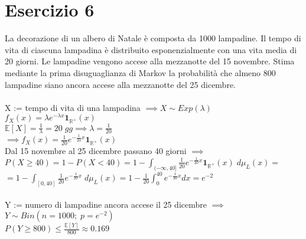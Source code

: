 \documentclass{article}
\begin{document}
\section*{Esercizio 6}
La decorazione di un albero di Natale è composta da 1000 lampadine. Il tempo di vita di ciascuna lampadina è distribuito esponenzialmente con una vita media di 20 giorni. Le lampadine vengono accese alla mezzanotte del 15 novembre. Stima mediante la prima disuguaglianza di Markov la probabilità che almeno 800 lampadine siano ancora accese alla mezzanotte del 25 dicembre.\\
\\
X := tempo di vita di una lampadina $\implies X \sim Exp(\lambda)$\\
$f_{X}(x) = \lambda e^{-\lambda x} \mathbf{1}_{\mathbb{R}^{+}}(x)$\\
$\mathbb{E}[X] = \frac{1}{\lambda} = 20 \; gg \implies \lambda = \frac{1}{20}$\\
$\implies f_{X}(x) = \frac{1}{20} e^{-\frac{1}{20} x} \mathbf{1}_{\mathbb{R}^{+}}(x)$\\
Dal 15 novembre al 25 dicembre passano 40 giorni $\implies$\\
$P(X \geq 40) = 1-P(X<40) = 1-\int_{(-\infty,40]}^{}\frac{1}{20}e^{-\frac{1}{20}x}\mathbf{1}_{\mathbb{R}^{+}}(x) \; d\mu_{L}(x) =$\\
$= 1-\int_{[0,40]}^{}\frac{1}{20}e^{-\frac{1}{20}x} \; d\mu_{L}(x) = 1-\frac{1}{20}\int_{0}^{40}e^{-\frac{1}{20}x}dx = e^{-2}$\\ \\
Y := numero di lampadine ancora accese il 25 dicembre $\implies$\\
$Y \sim Bin(n=1000; \; p=e^{-2})$\\
$P(Y \geq 800) \leq \frac{\mathbb{E}[Y]}{800} \approx 0.169$
\end{document}

